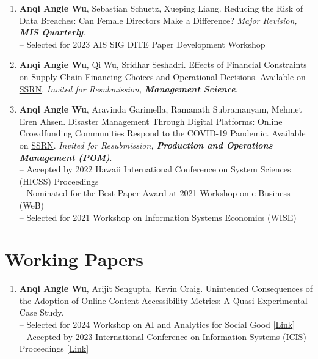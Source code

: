 \documentclass[margin,line]{resume}
\begin{document}
\begin{resume}
\begin{enumerate}[topsep=0pt, leftmargin=*]
       \item \textbf{Anqi Angie Wu}, Sebastian Schuetz, Xueping Liang. Reducing the Risk of Data Breaches: Can Female Directors Make a Difference? \textit{Major Revision, \textbf{MIS Quarterly}}.\\[0.3em]
       -- Selected for 2023 AIS SIG DITE Paper Development Workshop\\[-0.5em]  
       
        \item \textbf{Anqi Angie Wu}, Qi Wu, Sridhar Seshadri. Effects of Financial Constraints on Supply Chain Financing Choices and Operational Decisions. Available on \href{https://ssrn.com/abstract=4603080}{{SSRN}}. \textit{Invited for Resubmission, \textbf{Management Science}}. \\[-0.5em]  
       
         \item \textbf{Anqi Angie Wu}, Aravinda Garimella, Ramanath Subramanyam, Mehmet Eren Ahsen. Disaster Management Through Digital Platforms: Online Crowdfunding Communities Respond to the COVID-19 Pandemic. Available on \href{https://papers.ssrn.com/abstract=3779438}{{SSRN}}. \textit{Invited for Resubmission, \textbf{Production and Operations Management (POM)}}. \\ 	     [0.3em]
         -- Accepted by 2022 Hawaii International Conference on System Sciences (HICSS) Proceedings\\
         -- Nominated for the Best Paper Award at 2021 Workshop on e-Business (WeB)\\
         -- Selected for 2021 Workshop on Information Systems Economics (WISE)

 	  \end{enumerate}   

\section{\mysidestyle Working Papers}  	  \begin{enumerate}[topsep=0pt, leftmargin=*]     
       \item \textbf{Anqi Angie Wu}, Arijit Sengupta, Kevin Craig. Unintended Consequences of the Adoption of Online Content Accessibility Metrics: A Quasi-Experimental Case Study. %
       \\[0.3em]\newpage 
       -- Selected for 2024 Workshop on AI and Analytics for Social Good [\href{https://docs.google.com/document/d/1xZB-3ohZTB3lVnvf-7iB4nPjuNslwKOI/edit}{Link}]\\    
       -- Accepted by 2023 International Conference on Information Systems (ICIS) Proceedings [\href{https://aisel.aisnet.org/icis2023/soc_impactIS/soc_impactIS/15/}{Link}]\\[-0.5em]


\end{enumerate}
\end{resume}
\end{document}
